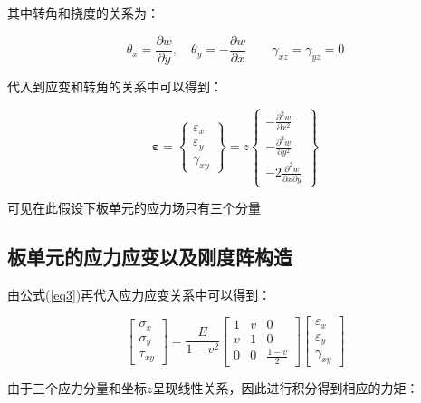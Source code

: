 \documentclass[forprint]{WHUBachelor}
\begin{document}
其中转角和挠度的关系为：

\begin{equation}
\theta_{x}=\frac{\partial w}{\partial y},\quad\theta_{y}=-\frac{\partial w}{\partial x}\qquad\gamma_{xz}=\gamma_{yz}=0\label{eq2}
\end{equation}

代入到应变和转角的关系中可以得到：

\begin{equation}
\boldsymbol{\varepsilon}=\left\{ \begin{array}{c}
{\varepsilon_{x}}\\
{\varepsilon_{y}}\\
{\gamma_{xy}}
\end{array}\right\} =z\left\{ \begin{array}{c}
{-\frac{\partial^{2}w}{\partial x^{2}}}\\
{-\frac{\partial^{2}w}{\partial y^{2}}}\\
{-2\frac{\partial^{2}w}{\partial x\partial y}}
\end{array}\right\} \label{eq3}
\end{equation}

可见在此假设下板单元的应力场只有三个分量

\subsection{板单元的应力应变以及刚度阵构造}

由公式(\ref{eq3})再代入应力应变关系中可以得到：

\begin{equation}
\left[\begin{array}{c}
{\sigma_{x}}\\
{\sigma_{y}}\\
{\tau_{xy}}
\end{array}\right]=\frac{E}{1-v^{2}}\left[\begin{array}{ccc}
{1} & {v} & {0}\\
{v} & {1} & {0}\\
{0} & {0} & {\frac{1-v}{2}}
\end{array}\right]\left[\begin{array}{c}
{\varepsilon_{x}}\\
{\varepsilon_{y}}\\
{\gamma_{xy}}
\end{array}\right]\label{eq4}
\end{equation}

由于三个应力分量和坐标$z$呈现线性关系，因此进行积分得到相应的力矩：
\end{document}
